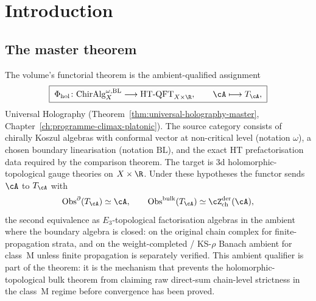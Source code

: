 \chapter*{Introduction}

\providecommand{\cH}{\mathcal{H}}
\providecommand{\Mbar}{\overline{\mathcal M}}
\providecommand{\fg}{\mathfrak{g}}
\providecommand{\Ydg}{Y^{\mathrm{dg}}}
\providecommand{\Zder}{\operatorname{Z}_{\mathrm{der}}}
\providecommand{\Abulk}{A_{\mathrm{bulk}}}
\providecommand{\Bbound}{B_{\partial}}
\providecommand{\dCrit}{\operatorname{dCrit}}
\providecommand{\RHom}{\operatorname{RHom}}
\providecommand{\Perf}{\operatorname{Perf}}
\providecommand{\cL}{\mathcal{L}}
\providecommand{\Tr}{\operatorname{Tr}}
\providecommand{\PhiFA}{\Phi^{\mathrm{FA}}}
\providecommand{\SpCh}{\mathrm{Sp}_{\mathrm{Ch}}}
\providecommand{\HolFA}{\mathrm{HolFA}}
\providecommand{\EdHolFA}{E_d\text{-}\HolFA}
\providecommand{\EnHolFA}{E_n\text{-}\HolFA}
\providecommand{\intSigma}{\textstyle\int_{\Sigma}}
\providecommand{\hCS}{\mathrm{hCS}}

\section*{The master theorem}

\noindent
The volume's functorial theorem is the ambient-qualified
assignment
\[
 \boxed{\;
 \Phi_{\mathrm{hol}}\colon
 \mathrm{ChirAlg}^{\omega,\mathrm{BL}}_{X}
 \longrightarrow
 \mathrm{HT\text{-}QFT}_{X \times \R},
 \qquad
 \cA \longmapsto T_\cA,
 \;}
\]
Universal Holography
(Theorem~\ref{thm:universal-holography-master},
Chapter~\ref{ch:programme-climax-platonic}). The source category
consists of chirally Koszul algebras with conformal vector at
non-critical level (notation $\omega$), a chosen boundary
linearisation (notation $\mathrm{BL}$), and the exact HT
prefactorisation data required by the comparison theorem. The
target is 3d holomorphic-topological gauge theories on
$X \times \R$. Under these hypotheses the functor sends $\cA$ to
$T_\cA$ with
\[
 \mathrm{Obs}^\partial(T_\cA) \simeq \cA,
 \qquad
 \mathrm{Obs}^{\mathrm{bulk}}(T_\cA) \simeq
 \cZ^{\mathrm{der}}_{\mathrm{ch}}(\cA),
\]
the second equivalence as $E_3$-topological factorisation
algebras in the ambient where the boundary algebra is closed:
on the original chain complex for finite-propagation strata, and on
the weight-completed / KS-$\rho$ Banach ambient for class~M unless
finite propagation is separately verified. This ambient qualifier is
part of the theorem: it is the mechanism that prevents the
holomorphic-topological bulk theorem from claiming raw direct-sum
chain-level strictness in the class~M regime before convergence has
been proved.

